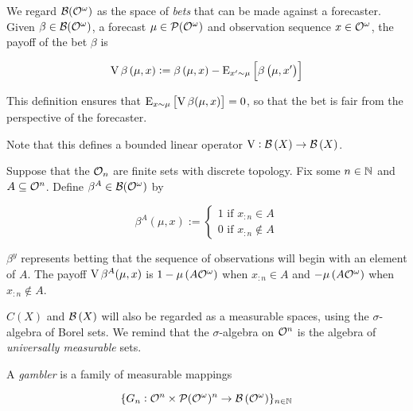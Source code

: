 We regard $\mathcal{B}(\mathcal{O}^\omega)$ as the space of \emph{bets} that can be made against a forecaster. Given $\beta \in \mathcal{B}(\mathcal{O}^\omega)$, a forecast $\mu \in \mathcal{P}(\mathcal{O}^\omega)$ and observation sequence $x \in \mathcal{O}^\omega$, the payoff of the bet $\beta$ is

\begin{equation}
\operatorname{V}{\beta}\left(\mu,x\right):=\beta\left(\mu,x\right) - \operatorname{E}_{x' \sim \mu}\left[\beta\left(\mu,x'\right)\right]
\end{equation}

This definition ensures that $\operatorname{E}_{x\sim\mu}\left[\operatorname{V}{\beta}(\mu,x)\right] = 0$, so that the bet is fair from the perspective of the forecaster.

Note that this defines a bounded linear operator $\operatorname{V}: \mathcal{B}\left(X\right) \rightarrow \mathcal{B}\left(X\right)$.

\begin{samepage}
\begin{example}

Suppose that the $\mathcal{O}_n$ are finite sets with discrete topology. Fix some $n\in\mathbb{N}$ and $A \subseteq \mathcal{O}^n$. Define $\beta^A \in \mathcal{B}(\mathcal{O}^\omega)$ by

\begin{equation}
\beta^{A}(\mu,x):=\begin{cases} 1 \text{ if } x_{:n} \in A \\ 0 \text{ if } x_{:n} \not\in A \end{cases}
\end{equation}


$\beta^y$ represents betting that the sequence of observations will begin with an element of $A$. The payoff $\operatorname{V}{\beta^A}(\mu,x)$ is $1 - \mu\left(A\mathcal{O}^\omega\right)$ when $x_{:n} \in A$ and $-\mu\left(A\mathcal{O}^\omega\right)$ when $x_{:n} \not\in A$.

\end{example}
\end{samepage}

$C\left(X\right)$ and $\mathcal{B}\left(X\right)$ will also be regarded as a measurable spaces, using the $\sigma$-algebra of Borel sets. We remind that the $\sigma$-algebra on $\mathcal{O}^n$ is the algebra of \emph{universally measurable} sets.

\begin{definition}

A \emph{gambler} is a family of measurable mappings

\[\{G_n : \mathcal{O}^n \times \mathcal{P}(\mathcal{O}^\omega)^n \rightarrow \mathcal{B}\left(\mathcal{O}^\omega\right)\}_{n \in \mathbb{N}}\]

\end{definition}

